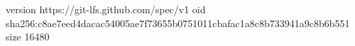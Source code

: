 version https://git-lfs.github.com/spec/v1
oid sha256:c8ae7eed4dacac54005ae7f73655b0751011cbafac1a8c8b733941a9c8b6b551
size 16480
